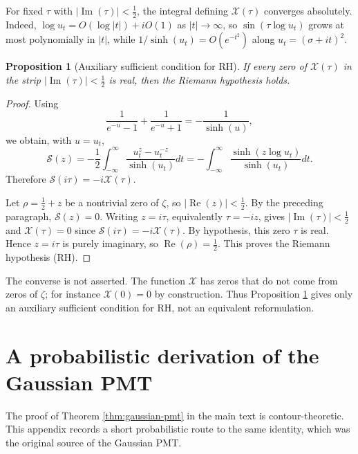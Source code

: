 \documentclass[12pt,english]{article}
\theoremstyle{plain} %
\newtheorem{proposition}{Proposition}
\theoremstyle{remark} %
\begin{document}
For fixed $\tau$ with $|\operatorname{Im}(\tau)|<\tfrac{1}{2}$, the integral
defining $\mathcal{X}(\tau)$ converges absolutely. Indeed,
$\log u_t=O(\log|t|)+iO(1)$ as $|t|\to\infty$, so
$\sin(\tau\log u_t)$ grows at most polynomially in $|t|$, while
$1/\sinh(u_t)=O(e^{-t^2})$ along $u_t=(\sigma+it)^2$.

\begin{proposition}[Auxiliary sufficient condition for RH]
\label{prop:X-sufficient-RH}
If every zero of $\mathcal{X}(\tau)$ in the strip
$|\operatorname{Im}(\tau)|<\tfrac{1}{2}$ is real, then the Riemann hypothesis
holds.
\end{proposition}

\begin{proof}
Using
$$
\frac{1}{e^{-u}-1}+\frac{1}{e^{-u}+1}
=
-\frac{1}{\sinh(u)},
$$
we obtain, with $u=u_t$,
$$
\mathcal{S}(z)
=
-\frac{1}{2}
\int_{-\infty}^{\infty}
\frac{u_t^z-u_t^{-z}}{\sinh(u_t)}dt
=
-\int_{-\infty}^{\infty}
\frac{\sinh(z\log u_t)}{\sinh(u_t)}dt.
$$
Therefore $\mathcal{S}(i\tau)=-i\mathcal{X}(\tau)$.

Let $\rho=\tfrac{1}{2}+z$ be a nontrivial zero of $\zeta$, so
$|\operatorname{Re}(z)|<\tfrac{1}{2}$. By the preceding paragraph,
$\mathcal{S}(z)=0$. Writing $z=i\tau$, equivalently $\tau=-iz$, gives
$|\operatorname{Im}(\tau)|<\tfrac{1}{2}$ and
$\mathcal{X}(\tau)=0$ since $\mathcal{S}(i\tau)=-i\mathcal{X}(\tau)$. By hypothesis, this zero
$\tau$ is real. Hence $z=i\tau$ is purely imaginary, so
$\operatorname{Re}(\rho)=\tfrac{1}{2}$. This proves the Riemann hypothesis (RH).
\end{proof}

The converse is not asserted. The function $\mathcal{X}$ has zeros that do not
come from zeros of $\zeta$; for instance $\mathcal{X}(0)=0$ by construction.
Thus Proposition \ref{prop:X-sufficient-RH} gives only an auxiliary sufficient
condition for RH, not an equivalent reformulation.


\section{A probabilistic derivation of the Gaussian PMT}
\label{app:probabilistic-gaussian-pmt}

The proof of Theorem \ref{thm:gaussian-pmt} in the main text is contour-theoretic. This appendix records a short probabilistic route to the same identity, which was the original source of the Gaussian PMT.
\end{document}
